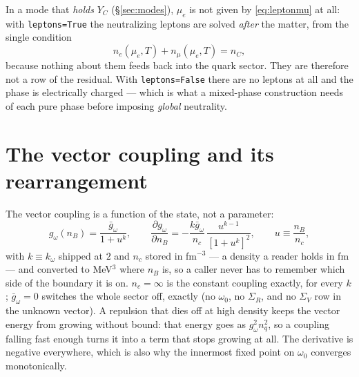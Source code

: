 \documentclass[11pt,a4paper]{article}
\newcommand{\code}[1]{\texttt{#1}}
\begin{document}
In a mode that \emph{holds} $Y_C$ (\S\ref{sec:modes}), $\mu_e$ is not given by
\eqref{eq:leptonmu} at all: with \code{leptons=True} the neutralizing leptons
are solved \emph{after} the matter, from the single condition
\begin{equation}
n_e(\mu_e,T) + n_\mu(\mu_e,T) = n_C,
\label{eq:neutralizing}
\end{equation}
because nothing about them feeds back into the quark sector. They are
therefore not a row of the residual. With \code{leptons=False} there are no
leptons at all and the phase is electrically charged --- which is what a
mixed-phase construction needs of each pure phase before imposing
\emph{global} neutrality.

\section{The vector coupling and its rearrangement}
\label{sec:vector}

The vector coupling is a function of the state, not a parameter:
\begin{equation}
g_\omega(n_B) = \frac{\bar g_\omega}{1+u^{k}},
\qquad
\frac{\partial g_\omega}{\partial n_B}
 = -\frac{k\bar g_\omega}{n_c}\,\frac{u^{k-1}}{\left[1+u^{k}\right]^2},
\qquad u\equiv\frac{n_B}{n_c},
\label{eq:gomega}
\end{equation}
with $k\equiv k_\omega$ shipped at $2$ and $n_c$ stored in fm$^{-3}$ --- a
density a reader holds in fm --- and converted to MeV$^3$ where $n_B$ is, so a
caller never has to remember which side of the boundary it is on. $n_c=\infty$
is the constant coupling exactly, for every $k$; $\bar g_\omega=0$ switches
the whole sector off, exactly (no $\omega_0$, no $\Sigma_R$, and no
$\Sigma_V$ row in the unknown vector).
A repulsion that dies off at high density keeps the vector energy from growing
without bound: that energy goes as $g_\omega^2 n_q^2$, so a coupling falling
fast enough turns it into a term that stops growing at all. The derivative is
negative everywhere, which is also why the innermost fixed point on $\omega_0$
converges monotonically.
\end{document}
